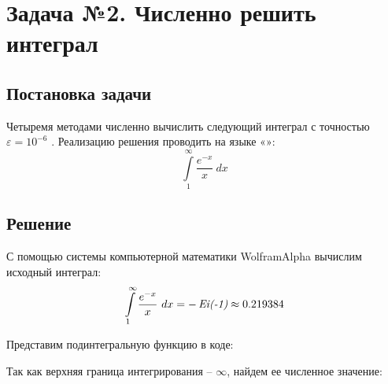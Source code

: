\newcommand{\task}{
	\int\limits_1^{\infty} {\frac{ e^{-x} }{ x } ~ dx}
}

\newcommand{\accuracy}{
	$\varepsilon = 10^{-6} $
}

\section{Задача №2. Численно решить интеграл}
	\subsection{Постановка задачи}
		Четыремя методами численно вычислить следующий интеграл с 
		точностью \accuracy. 
		Реализацию решения проводить на языке «\Csh»:
			\[ \task \]

	\subsection{Решение}
	
		С помощью системы компьютерной математики WolframAlpha вычислим исходный интеграл:
		\[ \task = -\Ei{-1} \approx 0.219384 \]
		
		Представим подинтегральную функцию в коде:
		
		
		
		Так как верхняя граница интегрирования -- $ \infty $, найдем ее
		численное значение:
		
		
		
		\begin{enumerate}
			
			
			
			\newpage
			
		\end{enumerate}
